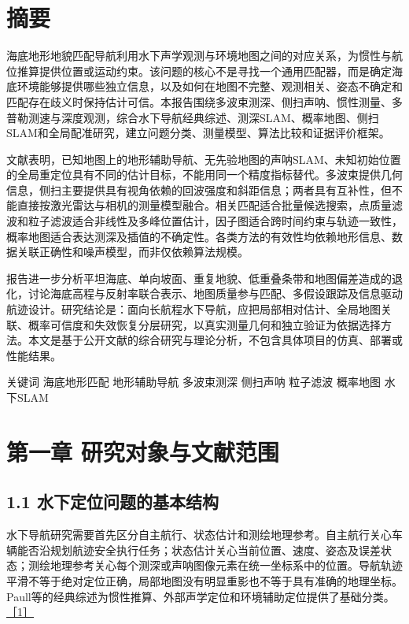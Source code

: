 \hypertarget{ux6458ux8981}{%
\section{摘要}\label{ux6458ux8981}}

海底地形地貌匹配导航利用水下声学观测与环境地图之间的对应关系，为惯性与航位推算提供位置或运动约束。该问题的核心不是寻找一个通用匹配器，而是确定海底环境能够提供哪些独立信息，以及如何在地图不完整、观测相关、姿态不确定和匹配存在歧义时保持估计可信。本报告围绕多波束测深、侧扫声呐、惯性测量、多普勒测速与深度观测，综合水下导航经典综述、测深SLAM、概率地图、侧扫SLAM和全局配准研究，建立问题分类、测量模型、算法比较和证据评价框架。

文献表明，已知地图上的地形辅助导航、无先验地图的声呐SLAM、未知初始位置的全局重定位具有不同的估计目标，不能用同一个精度指标替代。多波束提供几何信息，侧扫主要提供具有视角依赖的回波强度和斜距信息；两者具有互补性，但不能直接按激光雷达与相机的测量模型融合。相关匹配适合批量候选搜索，点质量滤波和粒子滤波适合非线性及多峰位置估计，因子图适合跨时间约束与轨迹一致性，概率地图适合表达测深及插值的不确定性。各类方法的有效性均依赖地形信息、数据关联正确性和噪声模型，而非仅依赖算法规模。

报告进一步分析平坦海底、单向坡面、重复地貌、低重叠条带和地图偏差造成的退化，讨论海底高程与反射率联合表示、地图质量参与匹配、多假设跟踪及信息驱动航迹设计。研究结论是：面向长航程水下导航，应把局部相对估计、全局地图关联、概率可信度和失效恢复分层研究，以真实测量几何和独立验证为依据选择方法。本文是基于公开文献的综合研究与理论分析，不包含具体项目的仿真、部署或性能结果。

关键词 海底地形匹配 地形辅助导航 多波束测深 侧扫声呐 粒子滤波 概率地图 水下SLAM

\hypertarget{ux7b2cux4e00ux7ae0-ux7814ux7a76ux5bf9ux8c61ux4e0eux6587ux732eux8303ux56f4}{%
\section{第一章 研究对象与文献范围}\label{ux7b2cux4e00ux7ae0-ux7814ux7a76ux5bf9ux8c61ux4e0eux6587ux732eux8303ux56f4}}

\hypertarget{ux6c34ux4e0bux5b9aux4f4dux95eeux9898ux7684ux57faux672cux7ed3ux6784}{%
\subsection{1.1 水下定位问题的基本结构}\label{ux6c34ux4e0bux5b9aux4f4dux95eeux9898ux7684ux57faux672cux7ed3ux6784}}

水下导航研究需要首先区分自主航行、状态估计和测绘地理参考。自主航行关心车辆能否沿规划航迹安全执行任务；状态估计关心当前位置、速度、姿态及误差状态；测绘地理参考关心每个测深或声呐图像元素在统一坐标系中的位置。导航轨迹平滑不等于绝对定位正确，局部地图没有明显重影也不等于具有准确的地理坐标。Paull等的经典综述为惯性推算、外部声学定位和环境辅助定位提供了基础分类。\href{https://people.csail.mit.edu/lpaull/publications/Paull_JOE_2014.pdf}{［1］}

